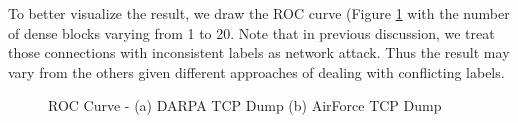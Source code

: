 To better visualize the result, we draw the ROC curve (Figure \ref{fig:t4.3_roc} with the number of dense blocks varying from 1 to 20. Note that in previous discussion, we treat those connections with inconsistent labels as network attack. Thus the result may vary from the others given different approaches of dealing with conflicting labels.   

\begin{figure}[!ht]
    \centering
    \caption{ROC Curve - (a) DARPA TCP Dump (b) AirForce TCP Dump}
    \label{fig:t4.3_roc}
\end{figure}

